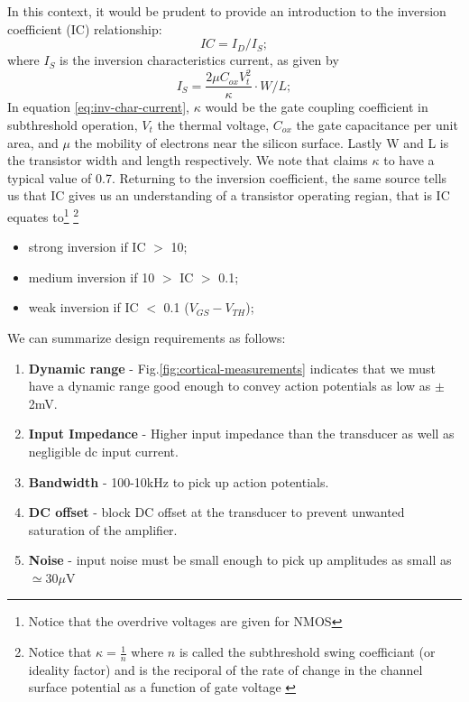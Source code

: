 In this context, it would be prudent to provide an introduction to the inversion coefficient (IC) relationship:
    \begin{equation} 
    \label{eq:IC}
      IC=I_D/I_S;
    \end{equation}
where $I_S$ is the inversion characteristics current, as given by
    \begin{equation} 
    \label{eq:inv-char-current}
      I_S= \frac{2 \mu C_{ox} V_t^2}{ \kappa } \cdot W/L;
    \end{equation}
In equation \ref{eq:inv-char-current}, $\kappa$ would be the gate coupling coefficient in subthreshold operation, $V_t$ the thermal voltage, $C_{ox}$ the gate capacitance per unit area, and $\mu$ the mobility of electrons near the silicon surface. Lastly W and L is the transistor width and length respectively. We note that \cite{harrison2003low} claims $\kappa$ to have a typical value of 0.7. Returning to the inversion coefficient, the same 
source tells us that IC gives us an understanding of a transistor operating regian, that is IC equates to\footnote{Notice that the overdrive voltages are given for NMOS} \footnote{Notice that $\kappa = \frac{1}{n}$ where $n$ is called the subthreshold swing coefficiant (or ideality factor) and is the reciporal of the rate of change in the channel surface potential as a function of gate voltage \cite{kursun2006multi}}

		    \begin{itemize}
    		    \item strong inversion if IC $>$ 10;
    		    \item medium inversion if 10 $>$ IC $>$ 0.1;
    		    \item weak inversion if IC $<$ 0.1 ($V_{GS}-V_{TH}$);
		    \end{itemize}

We can summarize design requirements as follows:

\begin{enumerate}
  \item\textbf{Dynamic range} - Fig.\ref{fig:cortical-measurements} indicates that we must have a dynamic range good enough to convey action potentials as low as $\pm$2mV.
  \item\textbf{Input Impedance} - Higher input impedance than the transducer as well as negligible dc input current.
  \item\textbf{Bandwidth} - 100-10kHz to pick up action potentials.
  \item\textbf{DC offset} - block DC offset at the transducer to prevent unwanted saturation of the amplifier.
  \item\textbf{Noise} - input noise must be small enough to pick up amplitudes as small as $\simeq$30$\mu$V
\end{enumerate}


